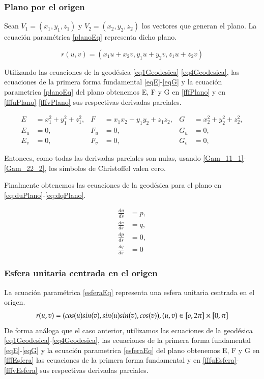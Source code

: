 \documentclass{endm}
\begin{document}
\subsubsection{Plano por el origen}
Sean $V_1=(x_1,y_1,z_1)$ y $V_2=(x_2,y_2,z_2)$ los vectores que generan el plano.
La ecuaci\'on param\'etrica \ref{planoEq} representa dicho plano.

\begin{equation} \label{planoEq}
r(u,v) = (x_1 u + x_2 v, y_1 u + y_2 v, z_1 u + z_2 v)
\end{equation}

Utilizando las ecuaciones de la geod\'esica \ref{eq1Geodesica}-\ref{eq4Geodesica}, las ecuaciones de la primera forma fundamental \ref{eqE}-\ref{eqG} y la ecuaci\'on parametrica \ref{planoEq} del plano obtenemos E, F y G en \ref{fffPlano}  y en \ref{fffuPlano}-\ref{fffvPlano} sus respectivas derivadas parciales.

\begin{align} 
E&=x_1^2 + y_1^2 + z_1^2,   & F &=x_1 x_2 + y_1 y_2 + z_1 z_2,   & G&=x_2^2 + y_2^2 + z_2^2, \label{fffPlano} \\
E_u&=0,     & F_u&=0,   & G_u&=0, \label{fffuPlano}\\
E_v&=0,    & F_v&=0,   & G_v&=0, \label{fffvPlano}
\end{align}

Entonces, como todas las derivadas parciales son nulas, usando \ref{Gam_11_1}-\ref{Gam_22_2}, los s\'imbolos de Christoffel valen cero.

Finalmente obtenemos las ecuaciones de la geod\'esica para el plano en \ref{eq:duPlano}-\ref{eq:dqPlano}.

\begin{align}
\frac{du}{ds}&=p,\label{eq:duPlano} \\
\frac{dv}{ds}&=q,\label{eq:dvPlano}     \\
\frac{dp}{ds}&=0, \label{eq:dpPlano}\\ 
\frac{dq}{ds}&=0 \label{eq:dqPlano}
\end{align}

\subsubsection{Esfera unitaria centrada en el origen}

La ecuaci\'on param\'etrica \ref{esferaEq} representa una esfera unitaria centrada en el origen.
\begin{equation} \label{esferaEq}
r(u,v) = (cos (u) sin(v), sin (u) sin (v),cos (v)), \\
(u,v) \in  [o, 2 \pi] \times [0, \pi]
\end{equation}
De forma an\'aloga que el caso anterior, utilizamos las ecuaciones de la geod\'esica \ref{eq1Geodesica}-\ref{eq4Geodesica}, las ecuaciones de la primera forma fundamental \ref{eqE}-\ref{eqG} y la ecuaci\'on parametrica \ref{esferaEq} del plano obtenemos E, F y G en \ref{fffEsfera} las ecuaciones de la primera forma fundamental y en \ref{fffuEsfera}-\ref{fffvEsfera} sus respectivas derivadas parciales.
\end{document}
